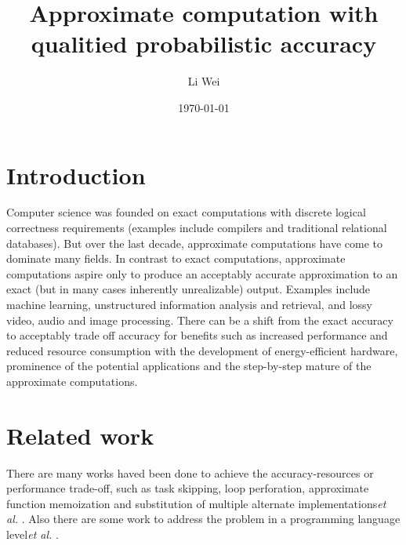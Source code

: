 \documentclass[a4paper]{article}
\title{Approximate computation with qualitied probabilistic accuracy}
\author{Li Wei}
\date{\today}
\newcommand{\etal}{\emph{et al.} }
\begin{document}
\maketitle

\section{Introduction}

Computer science was founded on exact computations with discrete logical correctness requirements (examples include compilers and traditional relational databases). But over the last decade, approximate computations have come to dominate many fields. In contrast to exact computations, approximate computations aspire only to produce an acceptably accurate approximation to an exact (but in many cases inherently unrealizable) output. Examples include machine learning, unstructured information analysis and retrieval, and lossy video, audio and image processing. There can be a shift from the exact accuracy to acceptably trade off accuracy for benefits such as increased performance and reduced resource consumption with the development of energy-efficient hardware, prominence of the potential applications and the step-by-step mature of the approximate computations. 

\section{Related work}
There are many works haved been done to achieve the accuracy-resources or performance trade-off, such as task skipping, loop perforation, approximate function memoization and substitution of multiple alternate implementations\etal\cite{zyzhu}. Also there are some work to address the problem in a programming language level\etal\cite{enerj}.


\end{document}
